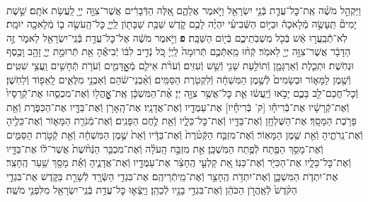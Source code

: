 \documentclass[twoside, openany, parskip=half, 11pt]{book}
\begin{document}
\begin{footnotesize}
\begin{multicols}{2}
\\
וַיַּקְהֵ֣ל מֹשֶׁ֗ה אֶֽת־כׇּל־עֲדַ֛ת בְּֿנֵ֥י יִשְׂרָאֵ֖ל וַיֹּ֣אמֶר אֲלֵהֶ֑ם אֵ֚לֶּה הַדְּֿבָרִ֔ים אֲשֶׁר־צִוָּ֥ה יְיָ֖ לַֽעֲשׂ֥ת אֹתָֽם׃ שֵׁ֣שֶׁת יָמִים֘ תֵּֽעָשֶׂ֣ה מְֿלָאכָה֒ וּבַיּ֣וֹם הַשְּֿׁבִיעִ֗י יִהְיֶ֨ה לָכֶ֥ם קֹ֛דֶשׁ שַׁבַּ֥ת שַׁבָּת֖וֹן לַֽיְיָ֑ כׇּל־הָֽעֹשֶׂ֥ה ב֛וֹ מְֿלָאכָ֖ה יוּמָֽת׃ לֹֽא־תְֿֿבַֽעֲר֣וּ אֵ֔שׁ בְּֿכֹ֖ל מֽשְׁבֹֽתֵיכֶ֑ם בְּֿי֖וֹם הַשַּׁבָּֽת׃ \textbf{פ}
וַיֹּ֣אמֶר מֹשֶׁ֔ה אֶל־כׇּל־עֲדַ֥ת בְּֿנֵֽי־יִשְׂרָאֵ֖ל לֵאמֹ֑ר זֶ֣ה הַדָּבָ֔ר אֲשֶׁר־צִוָּ֥ה יְיָ֖ לֵאמֹֽר׃ קְֿח֨וּ מֵֽאִתְּֿכֶ֤ם תְּֿרוּמָה֙ לַֽיְיָ֔ כֹּ֚ל נְֿדִ֣יב לִבּ֔וֹ יְֿבִיאֶ֕הָ אֵ֖ת תְּֿרוּמַ֣ת יְיָ֑ זָהָ֥ב וָכֶ֖סֶף וּנְחֹֽשֶׁת׃ וּתְכֵ֧לֶת וְֿאַרְגָּמָ֛ן וְֿתוֹלַ֥עַת שָׁנִ֖י וְֿשֵׁ֥שׁ וְֿעִזִּֽים׃ וְֿעֹרֹ֨ת אֵילִ֧ם מְֿאׇׇׇׇׇׇׇׇׇׇׇׇָדָּמִ֛ים וְֿעֹרֹ֥ת תְּֿחָשִׁ֖ים וַֽעֲצֵ֥י שִׁטִּֽים׃ וְֿשֶׁ֖מֶן לַמָּא֑וֹר וּבְשָׂמִים֙ לְֿשֶׁ֣מֶן הַמִּשְׁחָ֔ה וְֿלִקְטֹ֖רֶת הַסַּמִּֽים׃ וְֿאַ֨בְנֵי־שֹׁ֔הַם וְֿאַבְנֵ֖י מִלֻּאִ֑ים לָֽאֵפ֖וֹד וְֿלַחֹֽשֶׁן׃ וְֿכׇל־חֲכַם־לֵ֖ב בָּכֶ֑ם יָבֹ֣אוּ וְֿיַֽעֲשׂ֔וּ אֵ֛ת כׇּל־אֲשֶׁ֥ר צִוָּ֖ה יְיָ׃
אֶ֨ת־הַמִּשְׁכָּ֔ן אֶֽת־אׇׇׇׇׇׇׇׇׇׇָֽהֳל֖וֹ וְֿאֶת־מִכְסֵ֑הוּ אֶת־קְֿרָסָיו֙ וְֿאֶת־קְֿרָשָׁ֔יו אֶת־בְּֿֿרִיחָ֕ו [ק' בְּֿרִיחָ֕יו] אֶת־עַמֻּדָ֖יו וְֿאֶת־אֲדָנָֽיו׃ אֶת־הָֽאָרֹ֥ן וְֿאֶת־בַּדָּ֖יו אֶת־הַכַּפֹּ֑רֶת וְֿאֵ֖ת פָּרֹ֥כֶת הַמָּסָֽךְ׃ אֶת־הַשֻּׁלְחָ֥ן וְֿאֶת־בַּדָּ֖יו וְֿאֶת־כׇּל־כֵּלָ֑יו וְֿאֵ֖ת לֶ֥חֶם הַפָּנִֽים׃ וְֿאֶת־מְֿנֹרַ֧ת הַמָּא֛וֹר וְֿאֶת־כֵּלֶ֖יהָ וְֿאֶת־נֵֽרֹתֶ֑יהָ וְֿאֵ֖ת שֶׁ֥מֶן הַמָּאֽוֹר׃ וְֿאֶת־מִזְבַּ֤ח הַקְּֿטֹ֨רֶת֙ וְֿאֶת־בַּדָּ֔יו וְֿאֵת֙ שֶׁ֣מֶן הַמִּשְׁחָ֔ה וְֿאֵ֖ת קְֿטֹ֣רֶת הַסַּמִּ֑ים וְֿאֶת־מָסַ֥ךְ הַפֶּ֖תַח לְֿפֶ֥תַח הַמִּשְׁכָּֽן׃ אֵ֣ת מִזְבַּ֣ח הָֽעֹלָ֗ה וְֿאֶת־מִכְבַּ֤ר הַנְּֿחֹ֨שֶׁת֙ אֲשֶׁר־ל֔וֹ אֶת־בַּדָּ֖יו וְֿאֶת־כׇּל־כֵּלָ֑יו אֶת־הַכִּיֹּ֖ר וְֿאֶת־כַּנּֽוֹ׃ אֵ֚ת קַלְעֵ֣י הֶֽחָצֵ֔ר אֶת־עַמֻּדָ֖יו וְֿאֶת־אֲדָנֶ֑יהָ וְֿאֵ֕ת מָסַ֖ךְ שַׁ֥עַר הֶֽחָצֵֽר׃ אֶת־יִתְדֹ֧ת הַמִּשְׁכָּ֛ן וְֿאֶת־יִתְדֹ֥ת הֶֽחָצֵ֖ר וְֿאֶת־מֵֽיתְֿרֵיהֶֽם׃ אֶת־בִּגְדֵ֥י הַשְּֿׂרָ֖ד לְֿשָׁרֵ֣ת בַּקֹּ֑דֶשׁ אֶת־בִּגְדֵ֤י הַקֹּ֨דֶשׁ֙ לְֿאַֽהֲרֹ֣ן הַכֹּהֵ֔ן וְֿאֶת־בִּגְדֵ֥י בָנָ֖יו לְֿכַהֵֽן׃ וַיֵּֽצְֿא֛וּ כׇּל־עֲדַ֥ת בְּֿנֵֽי־יִשְׂרָאֵ֖ל מִלִּפְנֵ֥י מֹשֶֽׁה׃


\end{multicols}
\end{footnotesize}
\end{document}
